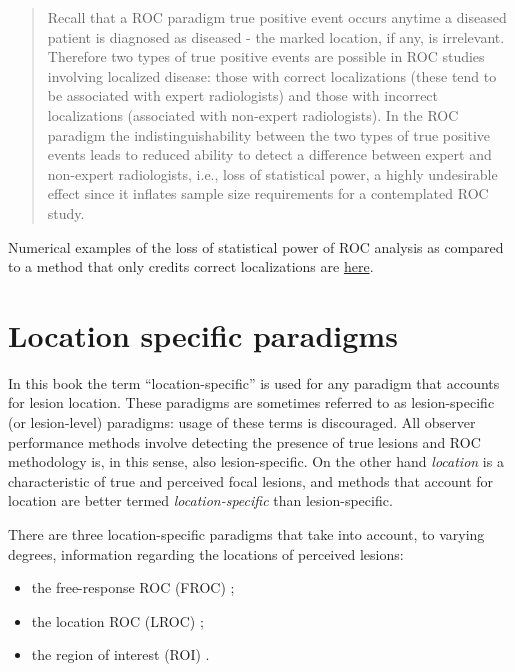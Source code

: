 \documentclass[
]{book}
\providecommand{\tightlist}{%
  \setlength{\itemsep}{0pt}\setlength{\parskip}{0pt}}
\begin{document}
\begin{quote}
Recall that a ROC paradigm true positive event occurs anytime a diseased patient is diagnosed as diseased - the marked location, if any, is irrelevant. Therefore two types of true positive events are possible in ROC studies involving localized disease: those with correct localizations (these tend to be associated with expert radiologists) and those with incorrect localizations (associated with non-expert radiologists). In the ROC paradigm the indistinguishability between the two types of true positive events leads to reduced ability to detect a difference between expert and non-expert radiologists, i.e., loss of statistical power, a highly undesirable effect since it inflates sample size requirements for a contemplated ROC study.
\end{quote}

Numerical examples of the loss of statistical power of ROC analysis as compared to a method that only credits correct localizations are \href{https://dpc10ster.github.io/RJafrocQuickStart/froc-sample-size.html}{here}.

\hypertarget{froc-paradigm-location-specific-paradigms}{%
\section{Location specific paradigms}\label{froc-paradigm-location-specific-paradigms}}

In this book the term ``location-specific'' is used for any paradigm that accounts for lesion location. These paradigms are sometimes referred to as lesion-specific (or lesion-level) paradigms: usage of these terms is discouraged. All observer performance methods involve detecting the presence of true lesions and ROC methodology is, in this sense, also lesion-specific. On the other hand \emph{location} is a characteristic of true and perceived focal lesions, and methods that account for location are better termed \emph{location-specific} than lesion-specific.

There are three location-specific paradigms that take into account, to varying degrees, information regarding the locations of perceived lesions:

\begin{itemize}
\tightlist
\item
  the free-response ROC (FROC) \citep{bunch1977free, chakraborty1989maximum};
\item
  the location ROC (LROC) \citep{starr1977comments, swensson1996unified};
\item
  the region of interest (ROI) \citep{obuchowski2010data}.
\end{itemize}
\end{document}
